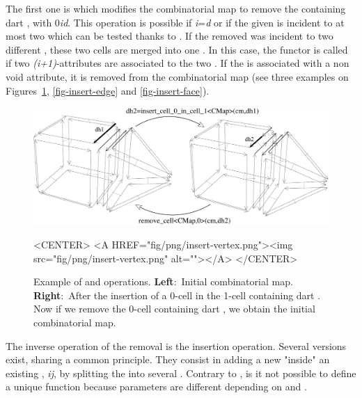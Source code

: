 The first one is  which modifies the
combinatorial map to remove the  containing dart ,
with 0\myleq{}\emph{i}\myleq{}\emph{d}. This operation is possible 
if \emph{i}=\emph{d} or if the given
 is incident to at most two  which can be tested
thanks to .  If the removed 
was incident to two different , these two cells are
merged into one . In this case, the  functor
is called if two \emph{(i+1)}-attributes are associated to the two
.  If the  is associated with a non void
attribute, it is removed from the combinatorial map  (see three
examples on Figures~\ref{fig-insert-vertex}, \ref{fig-insert-edge} and
\ref{fig-insert-face}).

\begin{figure}[htb]
  \begin{ccTexOnly}
    \begin{center}
      \includegraphics[width=.75\textwidth]{Combinatorial_map/fig/pdf/insert-vertex}
    \end{center}
  \end{ccTexOnly}
  \begin{ccHtmlOnly}
    <CENTER> <A HREF="fig/png/insert-vertex.png"><img
    src="fig/png/insert-vertex.png" alt=""></A> </CENTER>
  \end{ccHtmlOnly}
  \caption{Example of  and
     operations. \textbf{Left}:~Initial
    combinatorial map.  \textbf{Right}:~After the insertion of a
    0-cell in the 1-cell containing dart .  Now if we remove
    the 0-cell containing dart , we obtain the initial
    combinatorial map.}
  \label{fig-insert-vertex}
\end{figure}

The inverse operation of the removal is the insertion operation.
Several versions exist, sharing a common principle. They consist in
adding a new  "inside" an existing , \emph{i}\mylt{}\emph{j}, by
splitting the  into several .  Contrary to
, is it not possible to define a unique
 function because parameters
are different depending on  and .

